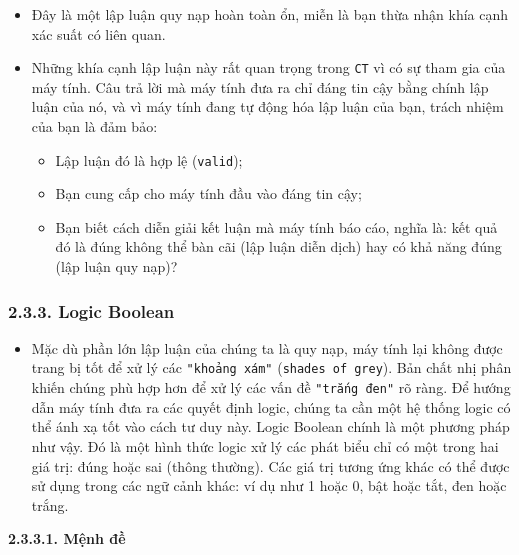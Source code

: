 \begin{itemize}
    \item Đây là một lập luận quy nạp hoàn toàn ổn, miễn là bạn thừa nhận khía cạnh xác suất có liên quan.

    \item Những khía cạnh lập luận này rất quan trọng trong \texttt{CT} vì có sự tham gia của máy tính. Câu trả lời mà máy tính đưa ra chỉ đáng tin cậy bằng chính lập luận của nó, và vì máy tính đang tự động hóa lập luận của bạn, trách nhiệm của bạn là đảm bảo:
    \begin{itemize}
        \item Lập luận đó là hợp lệ (\texttt{valid});
        \item Bạn cung cấp cho máy tính đầu vào đáng tin cậy;
        \item Bạn biết cách diễn giải kết luận mà máy tính báo cáo, nghĩa là: kết quả đó là đúng không thể bàn cãi (lập luận diễn dịch) hay có khả năng đúng (lập luận quy nạp)?
    \end{itemize}
\end{itemize}

\subsubsection*{2.3.3. Logic Boolean}

\begin{itemize}
    \item Mặc dù phần lớn lập luận của chúng ta là quy nạp, máy tính lại không được trang bị tốt để xử lý các \verb|"khoảng xám"| (\verb|shades of grey|). Bản chất nhị phân khiến chúng phù hợp hơn để xử lý các vấn đề \verb|"trắng đen"| rõ ràng. Để hướng dẫn máy tính đưa ra các quyết định logic, chúng ta cần một hệ thống logic có thể ánh xạ tốt vào cách tư duy này. Logic Boolean chính là một phương pháp như vậy. Đó là một hình thức logic xử lý các phát biểu chỉ có một trong hai giá trị: đúng hoặc sai (thông thường). Các giá trị tương ứng khác có thể được sử dụng trong các ngữ cảnh khác: ví dụ như 1 hoặc 0, bật hoặc tắt, đen hoặc trắng.
\end{itemize}

\noindent \textbf{2.3.3.1. Mệnh đề}

